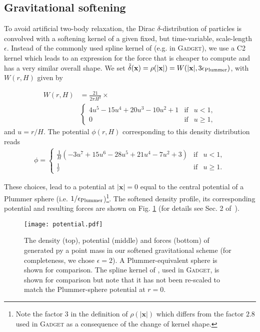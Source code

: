 \subsection{Gravitational softening}

To avoid artificial two-body relaxation, the Dirac
$\delta$-distribution of particles is convolved with a softening
kernel of a given fixed, but time-variable, scale-length
$\epsilon$. Instead of the commonly used spline kernel of
\cite{Monaghan1985} (e.g. in \textsc{Gadget}), we use a C2 kernel
\citep{Wendland1995} which leads to an expression for the force that
is cheaper to compute and has a very similar overall shape. We set
$\tilde\delta(\mathbf{x}) = \rho(|\mathbf{x}|) = W(|\mathbf{x}|,
3\epsilon_{\rm Plummer})$, with $W(r, H)$ given by

\begin{align}
W(r,H) &= \frac{21}{2\pi H^3} \times \nonumber \\
&\left\lbrace\begin{array}{rcl}
4u^5 - 15u^4 + 20u^3 - 10u^2 + 1 & \mbox{if} & u < 1,\\
0 & \mbox{if} & u \geq 1,
\end{array}
\right.
\end{align}
and $u = r/H$. The potential $\phi(r,H)$ corresponding to this density distribution reads
\begin{align}
\phi = 
\left\lbrace\begin{array}{rcl}
\frac{1}{H} (-3u^7 + 15u^6 - 28u^5 + 21u^4 - 7u^2 + 3) & \mbox{if} & u < 1,\\
\frac{1}{r} & \mbox{if} & u \geq 1.
\end{array}
\right.
\label{eq:fmm:potential}
\end{align}

These choices, lead to a potential at $|\mathbf{x}| = 0$ equal to the
central potential of a Plummer sphere (i.e. $1/\epsilon_{\rm
Plummer}$)\footnote{Note the factor $3$ in the definition of
$\rho(|\mathbf{x}|)$ which differs from the factor $2.8$ used
in \textsc{Gadget} as a consequence of the change of kernel
shape.}. The softened density profile, its corresponding potential and
resulting forces are shown on Fig. \ref{fig:fmm:softening} (for
details see Sec. 2 of~\cite{Price2007}).


\begin{figure}
\texttt{[image: potential.pdf]}
\caption{The density (top), potential (middle) and forces (bottom) of
generated py a point mass in our softened gravitational scheme (for
completeness, we chose $\epsilon=2$). A
Plummer-equivalent sphere is shown for comparison. The spline kernel
of \citet{Monaghan1985}, used in \textsc{Gadget}, is shown for
comparison but note that it has not been re-scaled to match the
Plummer-sphere potential at $r=0$.}
\label{fig:fmm:softening}
\end{figure}
